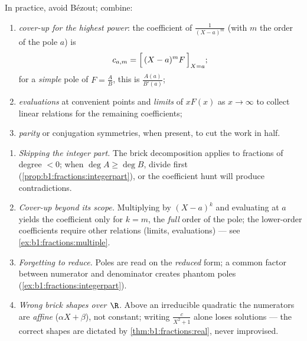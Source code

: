 \begin{method}\label{met:b1:fractions:compute}
In practice, avoid Bézout; combine:
\begin{enumerate}
  \item \emph{cover-up for the highest power}: the coefficient of
        $\frac{1}{(X-a)^m}$ (with $m$ the order of the pole $a$) is
        \[
        c_{a,m} = \Bigl[\,(X - a)^m F\,\Bigr]_{X = a};
        \]
        for a \emph{simple} pole of $F = \frac AB$, this is
        $\frac{A(a)}{B'(a)}$;
  \item \emph{evaluations} at convenient points and \emph{limits} of
        $xF(x)$ as $x \to \infty$ to collect linear relations for the
        remaining coefficients;
  \item \emph{parity} or conjugation symmetries, when present, to cut
        the work in half.
\end{enumerate}
\end{method}

\begin{remark}\label{rem:b1:fractions:pitfalls}
\begin{enumerate}
  \item \emph{Skipping the integer part.} The brick decomposition
        applies to fractions of degree $< 0$; when $\deg A \geq
        \deg B$, divide first
        (\cref{prop:b1:fractions:integerpart}), or the
        coefficient hunt will produce contradictions.
  \item \emph{Cover-up beyond its scope.} Multiplying by
        $(X - a)^k$ and evaluating at $a$ yields the coefficient
        only for $k = m$, the \emph{full} order of the pole; the
        lower-order coefficients require other relations (limits,
        evaluations) --- see \cref{ex:b1:fractions:multiple}.
  \item \emph{Forgetting to reduce.} Poles are read on the
        \emph{reduced} form; a common factor between numerator
        and denominator creates phantom poles
        (\cref{ex:b1:fractions:integerpart}).
  \item \emph{Wrong brick shapes over $\R$.} Above an irreducible
        quadratic the numerators are \emph{affine} ($\alpha X +
        \beta$), not constant; writing $\frac{c}{X^2 + 1}$ alone
        loses solutions --- the correct shapes are dictated by
        \cref{thm:b1:fractions:real}, never improvised.
\end{enumerate}
\end{remark}

